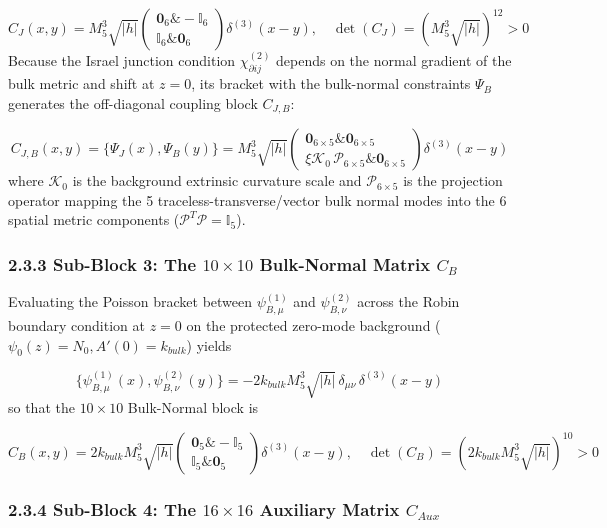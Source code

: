 \documentclass[aps,prd,onecolumn,superscriptaddress,nofootinbib,longbibliography,10pt]{revtex4-2}
\begin{document}
  \[ C_J(x,y) = M_5^3\sqrt{|h|}\begin{pmatrix} \mathbf{0}_6 \& -\mathbb{I}_6 \\ \mathbb{I}_6 \& \mathbf{0}_6 \end{pmatrix}\delta^{(3)}(x-y), \quad \det(C_J) = \left(M_5^3\sqrt{|h|}\right)^{12} > 0 \]
  Because the Israel junction condition \(\chi_{\partial ij}^{(2)}\) depends on the normal gradient of the bulk metric and shift at \(z = 0\), its bracket with the bulk-normal constraints \(\Psi_B\) generates the off-diagonal coupling block \(C_{J,B}\):


  \[ C_{J,B}(x,y) = \{\Psi_J(x), \Psi_B(y)\} = M_5^3\sqrt{|h|}\begin{pmatrix} \mathbf{0}_{6\times 5} \& \mathbf{0}_{6\times 5} \\ \xi\mathcal{K}_0\,\mathcal{P}_{6\times 5} \& \mathbf{0}_{6\times 5} \end{pmatrix}\delta^{(3)}(x-y) \]
  where \(\mathcal{K}_0\) is the background extrinsic curvature scale and \(\mathcal{P}_{6\times 5}\) is the projection operator mapping the 5 traceless-transverse/vector bulk normal modes into the 6 spatial metric components (\(\mathcal{P}^T\mathcal{P} = \mathbb{I}_5\)).



  
\subsubsection*{2.3.3 Sub-Block 3: The \(10 \times 10\) Bulk-Normal Matrix \(C_B\)}

  Evaluating the Poisson bracket between \(\psi_{B,\mu}^{(1)}\) and \(\psi_{B,\nu}^{(2)}\) across the Robin boundary condition at \(z = 0\) on the protected zero-mode background (\(\psi_0(z) = N_0, A'(0) = k_{bulk}\)) yields


  \[ \{\psi_{B,\mu}^{(1)}(x), \psi_{B,\nu}^{(2)}(y)\} = -2k_{bulk}M_5^3\sqrt{|h|}\,\delta_{\mu\nu}\,\delta^{(3)}(x-y) \]
  so that the \(10 \times 10\) Bulk-Normal block is


  \[ C_B(x,y) = 2k_{bulk}M_5^3\sqrt{|h|}\begin{pmatrix} \mathbf{0}_5 \& -\mathbb{I}_5 \\ \mathbb{I}_5 \& \mathbf{0}_5 \end{pmatrix}\delta^{(3)}(x-y), \quad \det(C_B) = \left(2k_{bulk}M_5^3\sqrt{|h|}\right)^{10} > 0 \]

  
\subsubsection*{2.3.4 Sub-Block 4: The \(16 \times 16\) Auxiliary Matrix \(C_{Aux}\)}
\end{document}
